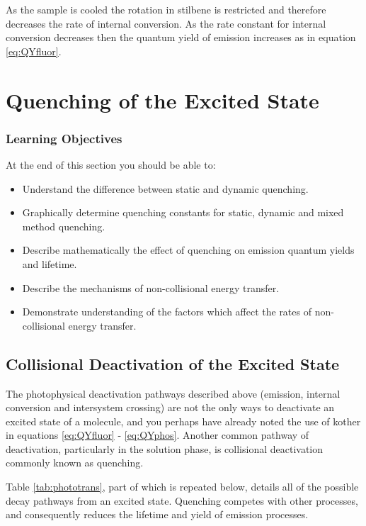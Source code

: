 \documentclass[
]{book}
\providecommand{\tightlist}{%
  \setlength{\itemsep}{0pt}\setlength{\parskip}{0pt}}
\begin{document}
As the sample is cooled the rotation in stilbene is restricted and therefore decreases the rate of internal conversion. As the rate constant for internal conversion decreases then the quantum yield of emission increases as in equation \eqref{eq:QYfluor}.

\hypertarget{ch:Quench}{%
\chapter{Quenching of the Excited State}\label{ch:Quench}}

\hypertarget{sec:QuenchLOs}{%
\subsection{Learning Objectives}\label{sec:QuenchLOs}}

At the end of this section you should be able to:

\begin{itemize}
\tightlist
\item
  Understand the difference between static and dynamic quenching.
\item
  Graphically determine quenching constants for static, dynamic and mixed method quenching.
\item
  Describe mathematically the effect of quenching on emission quantum yields and lifetime.
\item
  Describe the mechanisms of non-collisional energy transfer.
\item
  Demonstrate understanding of the factors which affect the rates of non-collisional energy transfer.
\end{itemize}

\hypertarget{sec:Collisional}{%
\section{Collisional Deactivation of the Excited State}\label{sec:Collisional}}

The photophysical deactivation pathways described above (emission, internal conversion and intersystem crossing) are not the only ways to deactivate an excited state of a molecule, and you perhaps have already noted the use of kother in equations \eqref{eq:QYfluor} - \eqref{eq:QYphos}. Another common pathway of deactivation, particularly in the solution phase, is collisional deactivation commonly known as quenching.

Table \ref{tab:phototrans}, part of which is repeated below, details all of the possible decay pathways from an excited state. Quenching competes with other processes, and consequently reduces the lifetime and yield of emission processes.
\end{document}
